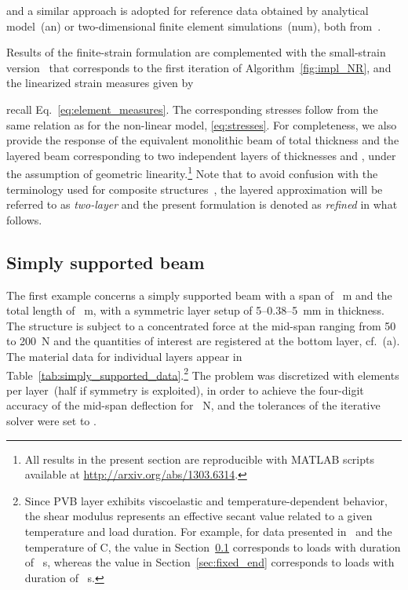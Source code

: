 \documentclass[11pt]{article}
\newcommand{\rev}[1]{#1}
\newcommand{\Eref}[1]{Eq.~\eqref{#1}}
\newcommand{\Sref}[1]{Section~\ref{#1}}
\newcommand{\Tref}[1]{Table~\ref{#1}}
\newcommand{\Alref}[1]{Algorithm~\ref{#1}}
\begin{document}
and a similar approach is adopted for reference data obtained by analytical
model~(an) or two-dimensional finite element simulations~(num), both
from~\cite{Asik:2005:MMB}.

Results of the finite-strain formulation are complemented with the small-strain
version~\cite{Zemanova:2008:SNM} that corresponds to the first iteration of
\Alref{fig:impl_NR}\rev{, and the linearized strain measures given by

recall \Eref{eq:element_measures}. The corresponding stresses follow from the
same relation as for the non-linear model, \eqref{eq:stresses}.} For
completeness, we also provide the response of the equivalent monolithic beam of
total thickness  and the layered beam corresponding to
two independent layers of thicknesses  and , \rev{under the
assumption of geometric linearity}.\footnote{All results in the present section
are reproducible with MATLAB scripts available at
\url{http://arxiv.org/abs/1303.6314}.} Note that to avoid confusion with the
terminology used for composite structures~\cite{Mau:1973:RLP}, the layered
approximation will \rev{be} referred to as \emph{two-layer} and the present
formulation is denoted as \emph{refined} in what follows.

\subsection{Simply supported beam}\label{sec:simply_supported}

The first example concerns a simply supported beam with a span of ~m and
the total length of ~m, with a symmetric layer setup of 5--0.38--5~mm in
thickness. The structure is subject to a concentrated force at the mid-span
ranging from 50 to 200~N and the quantities of interest are registered at the
bottom layer, cf.~(a). The material data for
individual layers appear in
\Tref{tab:simply_supported_data}.\footnote{\rev{Since PVB layer exhibits
viscoelastic and temperature-dependent behavior, the shear modulus 
represents an effective secant value related to a given temperature and load
duration. For example, for data presented in~\cite{Foraboschi:2007:BFS} and the
temperature of C, the value in \Sref{sec:simply_supported} corresponds
to loads with duration of ~s, whereas the value in
\Sref{sec:fixed_end} corresponds to loads with duration of ~s.\label{footnote}}} The problem was discretized with 
elements per layer~(half if symmetry is exploited), in order to achieve the
four-digit accuracy of the mid-span deflection for ~N, and the
tolerances of the iterative solver were set to .
\end{document}
